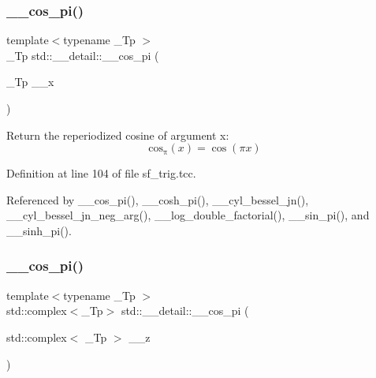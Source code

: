 \mbox{\label{namespacestd_1_1____detail_abfdaa500e1321747a0ad391ca3416a0b}} 
\subsubsection{\texorpdfstring{\+\_\+\+\_\+cos\+\_\+pi()}{\_\_cos\_pi()}\hspace{0.1cm}{\footnotesize\ttfamily [1/2]}}
{\footnotesize\ttfamily template$<$typename \+\_\+\+Tp $>$ \\
\+\_\+\+Tp std\+::\+\_\+\+\_\+detail\+::\+\_\+\+\_\+cos\+\_\+pi (\begin{DoxyParamCaption}\item[{\+\_\+\+Tp}]{\+\_\+\+\_\+x }\end{DoxyParamCaption})}

Return the reperiodized cosine of argument x\+: \[ \mathrm{cos_\pi}(x) = \cos(\pi x) \] 

Definition at line 104 of file sf\+\_\+trig.\+tcc.



Referenced by \+\_\+\+\_\+cos\+\_\+pi(), \+\_\+\+\_\+cosh\+\_\+pi(), \+\_\+\+\_\+cyl\+\_\+bessel\+\_\+jn(), \+\_\+\+\_\+cyl\+\_\+bessel\+\_\+jn\+\_\+neg\+\_\+arg(), \+\_\+\+\_\+log\+\_\+double\+\_\+factorial(), \+\_\+\+\_\+sin\+\_\+pi(), and \+\_\+\+\_\+sinh\+\_\+pi().

\mbox{\label{namespacestd_1_1____detail_a0332c7fb29ed7be543103adc8d04d39d}} 
\subsubsection{\texorpdfstring{\+\_\+\+\_\+cos\+\_\+pi()}{\_\_cos\_pi()}\hspace{0.1cm}{\footnotesize\ttfamily [2/2]}}
{\footnotesize\ttfamily template$<$typename \+\_\+\+Tp $>$ \\
std\+::complex$<$\+\_\+\+Tp$>$ std\+::\+\_\+\+\_\+detail\+::\+\_\+\+\_\+cos\+\_\+pi (\begin{DoxyParamCaption}\item[{std\+::complex$<$ \+\_\+\+Tp $>$}]{\+\_\+\+\_\+z }\end{DoxyParamCaption})}

